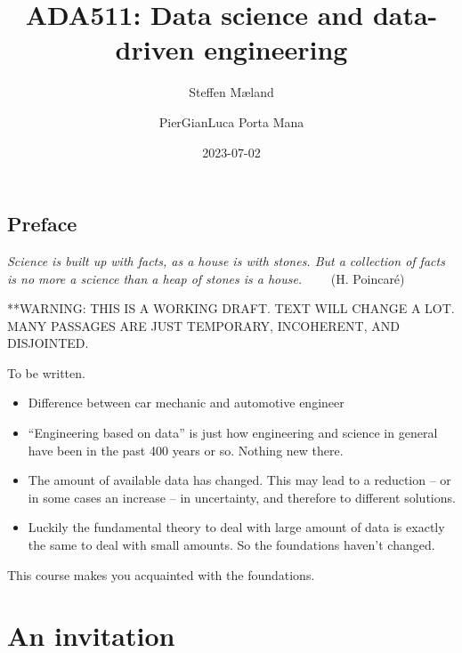 \documentclass[
  a4paper,
  DIV=11,
  numbers=noendperiod,
  oneside]{scrreprt}
\title{ADA511: Data science and data-driven engineering}
\author{Steffen Mæland \and PierGianLuca Porta Mana}
\date{2023-07-02}
\renewcommand*\contentsname{Table of contents}
\newcommand\contentsname{Table of contents}
\begin{document}
\maketitle
\ifdefined\Shaded\renewenvironment{Shaded}{\begin{tcolorbox}[interior hidden, borderline west={3pt}{0pt}{shadecolor}, breakable, boxrule=0pt, frame hidden, sharp corners, enhanced]}{\end{tcolorbox}}\fi

\renewcommand*\contentsname{Table of contents}
{
\hypersetup{linkcolor=}
\setcounter{tocdepth}{2}
\tableofcontents
}

\hypertarget{preface}{%
\chapter*{Preface}\label{preface}}


\hfill\break
\hfill\break
\hfill\break
\hfill\break
\hfill\break
\hfill\break

\emph{Science is built up with facts, as a house is with stones. But a
collection of facts is no more a science than a heap of stones is a
house.} ~~~~{(H. Poincaré)}

**WARNING: THIS IS A WORKING DRAFT. TEXT WILL CHANGE A LOT. MANY
PASSAGES ARE JUST TEMPORARY, INCOHERENT, AND DISJOINTED.

To be written.

\begin{itemize}
\item
  Difference between car mechanic and automotive engineer
\item
  ``Engineering based on data'' is just how engineering and science in
  general have been in the past 400 years or so. Nothing new there.
\item
  The amount of available data has changed. This may lead to a reduction
  -- or in some cases an increase -- in uncertainty, and therefore to
  different solutions.
\item
  Luckily the fundamental theory to deal with large amount of data is
  exactly the same to deal with small amounts. So the foundations
  haven't changed.
\end{itemize}

This course makes you acquainted with the foundations.

\part{An invitation}
\end{document}
